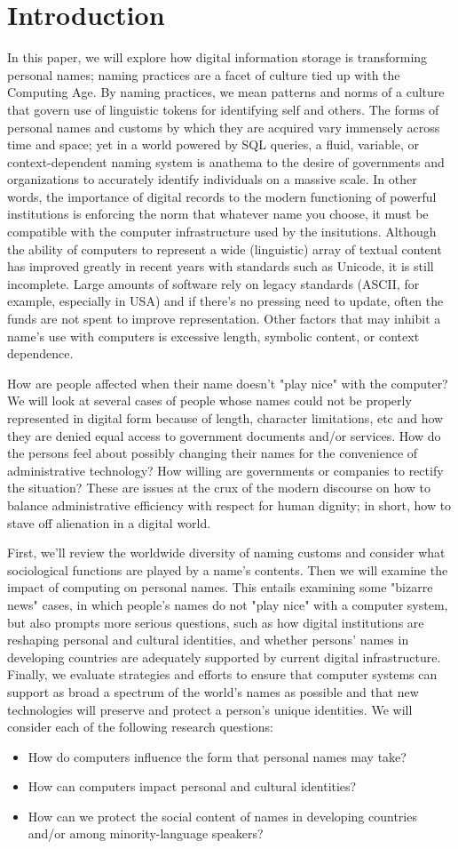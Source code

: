 \section{Introduction}

In this paper, we will explore how digital information storage is transforming
personal names; naming practices are a facet of culture tied up with the
Computing Age. By naming practices, we mean patterns and norms of a culture that
govern use of linguistic tokens for identifying self and others. The forms of
personal names and customs by which they are acquired vary immensely across time
and space; yet in a world powered by SQL queries, a fluid, variable, or
context-dependent naming system is anathema to the desire of governments and
organizations to accurately identify individuals on a massive scale. In other
words, the importance of digital records to the modern functioning of powerful
institutions is enforcing the norm that whatever name you choose, it must be
compatible with the computer infrastructure used by the insitutions. Although
the ability of computers to represent a wide (linguistic) array of textual
content has improved greatly in recent years with standards such as Unicode, it
is still incomplete.  Large amounts of software rely on legacy standards (ASCII,
for example, especially in USA) and if there's no pressing need to update, often
the funds are not spent to improve representation. Other factors that may
inhibit a name's use with computers is excessive length, symbolic content, or
context dependence.

How are people affected when their name doesn't "play nice" with the computer?
We will look at several cases of people whose names could not be properly
represented in digital form because of length, character limitations, etc and
how they are denied equal access to government documents and/or services. How do
the persons feel about possibly changing their names for the convenience of
administrative technology? How willing are governments or companies to rectify
the situation? These are issues at the crux of the modern discourse on how to
balance administrative efficiency with respect for human dignity; in short, how
to stave off alienation in a digital world.

First, we'll review the worldwide diversity of naming customs and consider what
sociological functions are played by a name's contents. Then we will examine the
impact of computing on personal names. This entails examining some "bizarre
news" cases, in which people's names do not "play nice" with a computer system,
but also prompts more serious questions, such as how digital institutions are
reshaping personal and cultural identities, and whether persons' names in
developing countries are adequately supported by current digital infrastructure.
Finally, we evaluate strategies and efforts to ensure that computer systems can
support as broad a spectrum of the world's names as possible and that new
technologies will preserve and protect a person's unique identities. We will
consider each of the following research questions:

\begin{itemize}
\item How do computers influence the form that personal names may take?
\item How can computers impact personal and cultural identities?
\item How can we protect the social content of names in developing countries
and/or among minority-language speakers?
\end{itemize}
